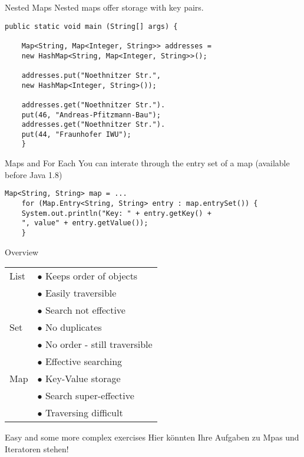 \begin{frame}[fragile]{Nested Maps}
	Nested maps offer storage with key pairs.
	\begin{lstlisting}[basicstyle=\ttfamily\scriptsize]
	public static void main (String[] args) {		
	
	Map<String, Map<Integer, String>> addresses = 
	new HashMap<String, Map<Integer, String>>();
	
	addresses.put("Noethnitzer Str.", 
	new HashMap<Integer, String>());
	
	addresses.get("Noethnitzer Str.").
	put(46, "Andreas-Pfitzmann-Bau");
	addresses.get("Noethnitzer Str.").
	put(44, "Fraunhofer IWU");
	}
	\end{lstlisting}
\end{frame}

\begin{frame}[fragile]{Maps and For Each}
	You can interate through the entry set of a map (available before Java 1.8)
	\begin{lstlisting}[basicstyle=\ttfamily\scriptsize]
	Map<String, String> map = ...
	for (Map.Entry<String, String> entry : map.entrySet()) {
	System.out.println("Key: " + entry.getKey() +
	", value" + entry.getValue());
	}
	\end{lstlisting}
\end{frame}

\begin{frame}{Overview}
	\begin{center}
		\begin{tabular}{ l | l }
			List & $ \bullet $ Keeps order of objects \\
			& $ \bullet $ Easily traversible \\
			& $ \bullet $ Search not effective \\
			\hline
			Set  & $ \bullet $ No duplicates \\
			& $ \bullet $ No order - still traversible \\
			& $ \bullet $ Effective searching \\
			\hline
			Map  & $ \bullet $ Key-Value storage \\
			& $ \bullet $ Search super-effective \\
			& $ \bullet $ Traversing difficult
			
		\end{tabular}
	\end{center}
\end{frame}

\begin{frame}{Easy and some more complex exercises}
	\huge Hier könnten Ihre Aufgaben zu Mpas und Iteratoren stehen!
\end{frame}



